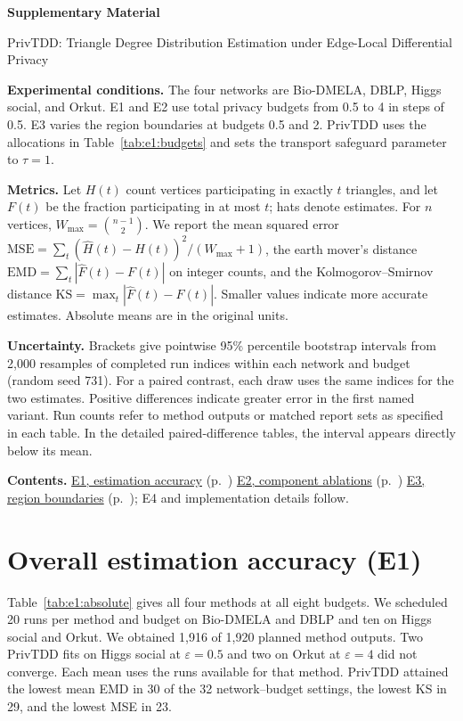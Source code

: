 \documentclass[10pt,letterpaper]{article}
\begin{document}
\thispagestyle{plain}
\begin{center}
{\LARGE\bfseries Supplementary Material\par}\vspace{4pt}
{\large PrivTDD: Triangle Degree Distribution Estimation under Edge-Local Differential Privacy\par}
\end{center}

\textbf{Experimental conditions.}
The four networks are Bio-DMELA, DBLP, Higgs social, and Orkut.
E1 and E2 use total privacy budgets from 0.5 to 4 in steps of 0.5.
E3 varies the region boundaries at budgets 0.5 and 2. PrivTDD uses the allocations in Table~\ref{tab:e1:budgets} and sets the transport safeguard parameter to $\tau=1$.

\textbf{Metrics.}
Let $H(t)$ count vertices participating in exactly $t$ triangles, and let $F(t)$ be
the fraction participating in at most $t$; hats denote estimates. For $n$ vertices,
$W_{\max}=\binom{n-1}{2}$. We report the mean squared error
$\mathrm{MSE}=\sum_t(\widehat H(t)-H(t))^2/(W_{\max}+1)$, the earth mover's
distance $\mathrm{EMD}=\sum_t|\widehat F(t)-F(t)|$ on integer counts, and the
Kolmogorov--Smirnov distance $\mathrm{KS}=\max_t|\widehat F(t)-F(t)|$.
Smaller values indicate more accurate estimates. Absolute means are in the original units.

\textbf{Uncertainty.}
Brackets give pointwise 95\% percentile bootstrap intervals from 2,000 resamples
of completed run indices within each network and budget (random seed 731).
For a paired contrast, each draw uses the same indices for the two estimates.
Positive differences indicate greater error in the first named variant.
Run counts refer to method outputs or matched report sets as specified in each table.
In the detailed paired-difference tables, the interval appears directly below its mean.

\textbf{Contents.}
\hyperref[sec:e1]{E1, estimation accuracy} (p.~\pageref{sec:e1}) \quad
\hyperref[sec:e2]{E2, component ablations} (p.~\pageref{sec:e2}) \quad
\hyperref[sec:e3]{E3, region boundaries} (p.~\pageref{sec:e3}); E4 and implementation details follow.

\section{Overall estimation accuracy (E1)}\label{sec:e1}
Table~\ref{tab:e1:absolute} gives all four methods at all eight budgets. We scheduled
20 runs per method and budget on Bio-DMELA and DBLP and ten on Higgs social and Orkut.
We obtained 1,916 of 1,920 planned method outputs. Two PrivTDD fits on Higgs social at $\varepsilon=0.5$
and two on Orkut at $\varepsilon=4$ did not converge. Each mean uses the runs
available for that method. PrivTDD attained the lowest mean EMD in 30 of the 32
network--budget settings, the lowest KS in 29, and the lowest MSE in 23.
\end{document}
